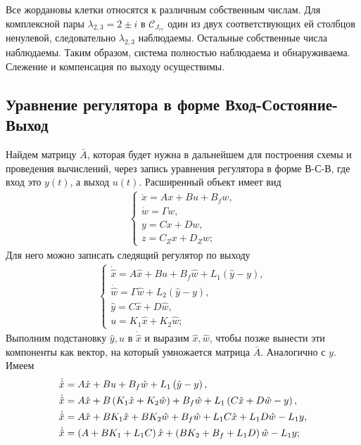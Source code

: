\documentclass[a4paper, 12pt]{article}
\begin{document}
    Все жордановы клетки относятся к различным собственным числам.
    Для комплексной пары $\lambda_{2,3}=2\pm i$ в $\mathcal{C}_{J_{re}}$ один из двух
    соответствующих ей столбцов ненулевой, следовательно $\lambda_{2,3}$ наблюдаемы.
    Остальные собственные числа наблюдаемы.
    Таким образом, система полностью наблюдаема и обнаруживаема.
    Слежение и компенсация по выходу осуществимы.


    \subsection{Уравнение регулятора в форме Вход-Состояние-Выход}
    Найдем матрицу $\bar{A}$, которая будет нужна в дальнейшем для построения схемы
    и проведения вычислений, через запись уравнения регулятора в форме В-С-В, где
    вход это $y(t)$, а выход $u(t)$.
    Расширенный объект имеет вид
    \begin{align}
        \begin{cases}
            \dot{x}=Ax+Bu+B_f w,\\
            \dot{ w}=\Gamma w,\\
            y=Cx+D w,\\
            z=C_Zx+D_Z w;
        \end{cases} \label{eq:ext_obj}
    \end{align}
    Для него можно записать следящий регулятор по выходу
    \begin{align}
        \begin{cases}
            \dot{\hat{x}}=A\hat{x}+Bu+B_f\hat{w}+L_1\left( \hat{y}-y \right),\\
            \dot{\hat{w}}=\Gamma \hat{w}+L_2\left( \hat{y}-y \right),\\
            \hat{y}=C\hat{x}+D\hat{w},\\
            u=K_1\hat{x}+K_2\hat{w};
        \end{cases}\label{eq:uout}
    \end{align}
    Выполним подстановку $\hat{y},u$ в $\dot{\hat{x}}$ и выразим $\hat{x},\hat{w}$, чтобы позже
    вынести эти компоненты как вектор, на который умножается матрица $\bar{A}$. Аналогично с $y$. Имеем
    \begin{align}
        &\dot{\hat{x}}=A\hat{x}+Bu+B_f\hat{w}+L_1\left( \hat{y}-y \right), \notag\\
        &\dot{\hat{x}}=A\hat{x}+B\left( K_1\hat{x}+K_2\hat{w} \right)+B_f\hat{w}+L_1\left( C\hat{x}+D\hat{w}-y \right), \notag\\
        &\dot{\hat{x}}=A\hat{x}+BK_1\hat{x}+BK_2\hat{w}+B_f\hat{w}+L_1C\hat{x}+L_1D\hat{w}-L_1y, \notag\\
        &\dot{\hat{x}}=\left( A+BK_1+L_1C \right)\hat{x}+\left( BK_2+B_f+L_1D \right)\hat{w}-L_1y \label{eq:dot_x_est};
    \end{align}
\end{document}
